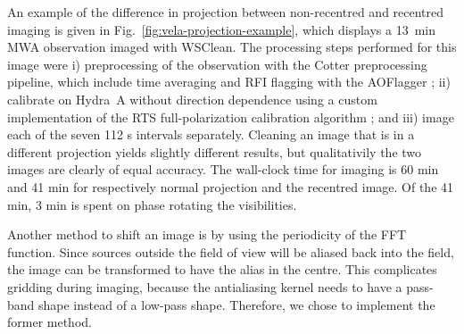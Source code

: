 \documentclass[useAMS,usenatbib]{mn2e}
\begin{document}
An example of the difference in projection between non-recentred and recentred imaging is given in Fig.~\ref{fig:vela-projection-example}, which displays a 13~min MWA observation imaged with WSClean. The processing steps performed for this image were i) preprocessing of the observation with the Cotter preprocessing pipeline, which include time averaging and RFI flagging with the AOFlagger \citep{post-correlation-rfi-classification,scale-invariant-rank-operator}; ii) calibrate on Hydra~A without direction dependence using a custom implementation of the RTS full-polarization calibration algorithm \citep{rts-mwa}; and iii) image each of the seven 112 s intervals separately. Cleaning an image that is in a different projection yields slightly different results, but qualitativily the two images are clearly of equal accuracy. The wall-clock time for imaging is 60 min and 41 min for respectively normal projection and the recentred image. Of the 41 min, 3 min is spent on phase rotating the visibilities.

Another method to shift an image is by using the periodicity of the FFT function. Since sources outside the field of view will be aliased back into the field, the image can be transformed to have the alias in the centre. This complicates gridding during imaging, because the antialiasing kernel needs to have a pass-band shape instead of a low-pass shape. Therefore, we chose to implement the former method.
\end{document}
